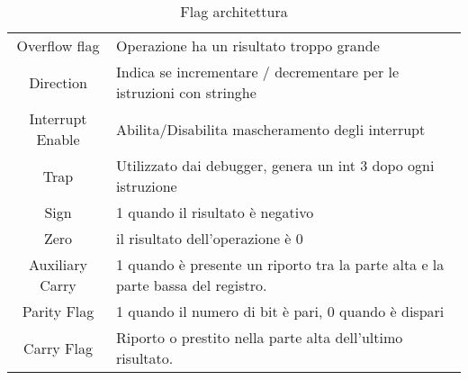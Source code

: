 \documentclass[../template]{subfiles}
\begin{document}
\begin{table}[ht]
    \centering
    \begin{tabu}{|c|l|}
        \hline
        Overflow flag& Operazione ha un risultato troppo grande\\
        Direction& Indica se incrementare / decrementare per le istruzioni con stringhe\\
        Interrupt Enable& Abilita/Disabilita mascheramento degli interrupt\\
        Trap& Utilizzato dai debugger, genera un int 3 dopo ogni istruzione\\
        Sign& 1 quando il risultato è negativo\\
        Zero& il risultato dell'operazione è 0\\
        Auxiliary Carry& 1 quando è presente un riporto tra la parte alta e la parte bassa del registro.\\
        Parity Flag& 1 quando il numero di bit è pari, 0 quando è dispari\\
        Carry Flag& Riporto o prestito nella parte alta dell'ultimo risultato.\\
        \hline
    \end{tabu}
    \caption{Flag architettura}
    \label{8086_flags}
\end{table}
\end{document}
